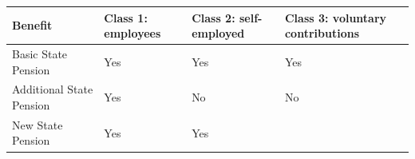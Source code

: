 \documentclass[]{tufte-handout}
\begin{document}
\begin{longtable}[]{@{}llll@{}}
\toprule
\begin{minipage}[b]{0.33\columnwidth}\raggedright
Benefit\strut
\end{minipage} & \begin{minipage}[b]{0.15\columnwidth}\raggedright
Class 1: employees\strut
\end{minipage} & \begin{minipage}[b]{0.17\columnwidth}\raggedright
Class 2: self-employed\strut
\end{minipage} & \begin{minipage}[b]{0.24\columnwidth}\raggedright
Class 3: voluntary contributions\strut
\end{minipage}\tabularnewline
\midrule
\endhead
\begin{minipage}[t]{0.33\columnwidth}\raggedright
Basic State Pension\strut
\end{minipage} & \begin{minipage}[t]{0.15\columnwidth}\raggedright
Yes\strut
\end{minipage} & \begin{minipage}[t]{0.17\columnwidth}\raggedright
Yes\strut
\end{minipage} & \begin{minipage}[t]{0.24\columnwidth}\raggedright
Yes\strut
\end{minipage}\tabularnewline
\begin{minipage}[t]{0.33\columnwidth}\raggedright
Additional State Pension\strut
\end{minipage} & \begin{minipage}[t]{0.15\columnwidth}\raggedright
Yes\strut
\end{minipage} & \begin{minipage}[t]{0.17\columnwidth}\raggedright
No\strut
\end{minipage} & \begin{minipage}[t]{0.24\columnwidth}\raggedright
No\strut
\end{minipage}\tabularnewline
\begin{minipage}[t]{0.33\columnwidth}\raggedright
New State Pension\strut
\end{minipage} & \begin{minipage}[t]{0.15\columnwidth}\raggedright
Yes\strut
\end{minipage} & \begin{minipage}[t]{0.17\columnwidth}\raggedright
Yes\strut
\end{minipage} & \begin{minipage}[t]{0.24\columnwidth}\raggedright

\end{minipage}
\end{longtable}
\end{document}
